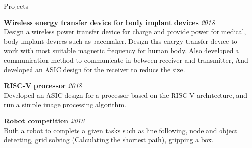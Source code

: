 \documentclass[
11pt, %
]{./assets/resume} %
\begin{document}






\begin{rSection}{Projects}

	\textbf{Wireless energy transfer device for body implant devices} \hfill \textit{2018}\\
	Design a wireless power transfer device for charge and provide power for medical, body implant devices such as pacemaker. Design this energy transfer device to work with most suitable magnetic frequency for human body. Also developed a communication method to communicate in between receiver and transmitter, And developed an ASIC design for the receiver to reduce the size.

	\textbf{RISC-V processor} \hfill \textit{2018}\\
	Developed an ASIC design for a processor based on the RISC-V architecture, and run a simple image processing algorithm.

	\textbf{Robot competition} \hfill \textit{2018}\\
	Built a robot to complete a given tasks such as line following, node and object detecting, grid solving (Calculating the shortest path), gripping a box.
	

\end{rSection}
\end{document}
